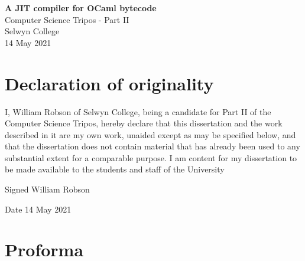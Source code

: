 
\newcommand{\thedate}{14 May 2021}

\begin{titlepage}


    \vspace*{60mm}

    \begin{center}
        \Huge
        \textbf{A JIT compiler for OCaml bytecode} \\[5mm]
        \Large
        Computer Science Tripos - Part II \\[5mm]
        Selwyn College \\[5mm]
        \thedate
    \end{center}

    \cleardoublepage

\end{titlepage}


\section*{Declaration of originality}

I, William Robson of Selwyn College, being a candidate for Part II of the Computer Science Tripos,
hereby declare that this dissertation and the work described in it are my own work, unaided except
as may be specified below, and that the dissertation does not contain material that has already
been used to any substantial extent for a comparable purpose. I am content for my dissertation to
be
made available to the students and staff of the University

Signed William Robson

Date \thedate

\clearpage

\section*{Proforma}

